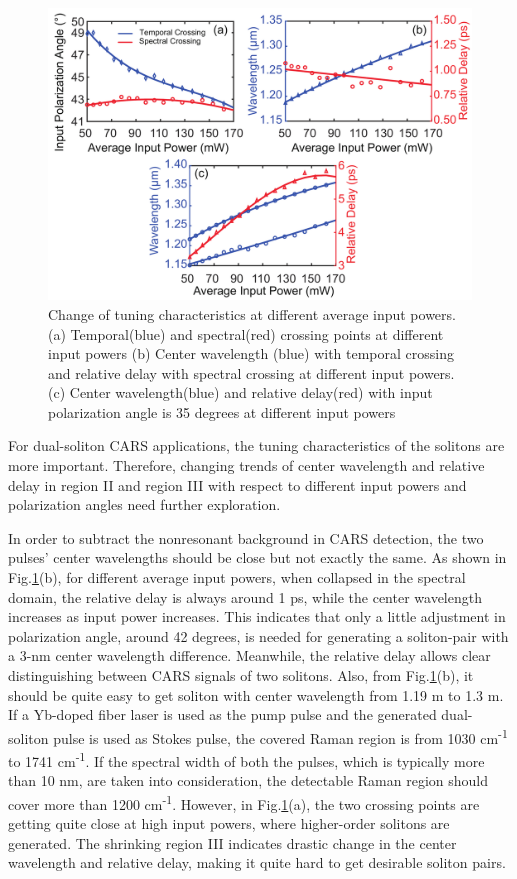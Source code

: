 \documentclass{osa-article}
\begin{document}
\begin{figure}[htbp]
\centering%
\includegraphics[width=320pt]{fig_tuning.pdf}
\caption{Change of tuning characteristics at different average input powers. (a) Temporal(blue) and spectral(red) crossing points at different input powers (b) Center wavelength (blue) with temporal crossing and relative delay with spectral crossing at different input powers. (c) Center wavelength(blue) and relative delay(red) with input polarization angle is 35 degrees at different input powers }
\label{fig_tuning}\vspace*{-6pt}
\end{figure}

For dual-soliton CARS applications\cite{chen_dual-soliton_2016,chen_quantitative_2016}, the tuning characteristics of the solitons are more important. Therefore, changing trends of center wavelength and relative delay in region II and region III with respect to different input powers and polarization angles need further exploration.  

In order to subtract the nonresonant background in CARS detection, the two pulses' center wavelengths should be close but not exactly the same\cite{rocha-mendoza_differential_2009}. As shown in Fig.\ref{fig_tuning}(b), for different average input powers, when collapsed in the spectral domain, the relative delay is always around 1 ps, while the center wavelength increases as input power increases. This indicates that only a little adjustment in polarization angle, around 42 degrees, is needed for generating a soliton-pair with a 3-nm center wavelength difference. Meanwhile, the relative delay allows clear distinguishing between CARS signals of two solitons. Also, from Fig.\ref{fig_tuning}(b), it should be quite easy to get soliton with center wavelength from 1.19 \textmu m to 1.3 \textmu m. If a Yb-doped fiber laser is used as the pump pulse and the generated dual-soliton pulse is used as Stokes pulse, the covered Raman region is from 1030 cm\textsuperscript{-1} to 1741 cm\textsuperscript{-1}. If the spectral width of both the pulses, which is typically more than 10 nm, are taken into consideration, the detectable Raman region should cover more than 1200 cm\textsuperscript{-1}. However, in Fig.\ref{fig_tuning}(a), the two crossing points are getting quite close at high input powers, where higher-order solitons are generated. The shrinking region III indicates drastic change in the center wavelength and relative delay, making it quite hard to get desirable soliton pairs.
\end{document}
